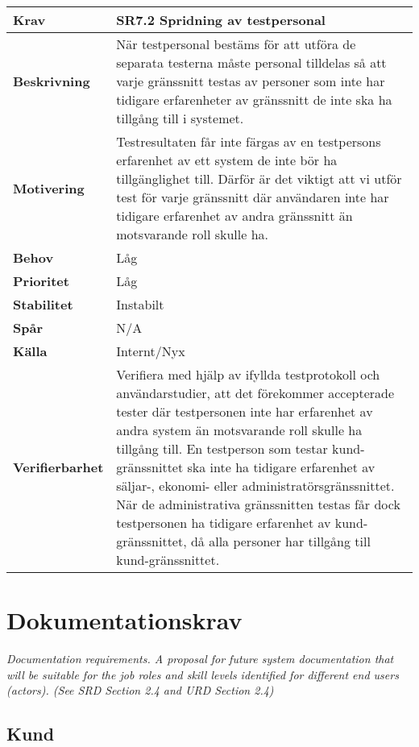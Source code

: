 \documentclass[a4paper, twoside, 11pt, titlepage]{article}
\begin{document}
	\begin{tabular} { p{2.6cm} p{12.5cm} }
		\hline
		\sffamily\textbf{Krav} & \sffamily\textbf{SR7.2 Spridning av testpersonal } \\
		\hline
		\sffamily\textbf{Beskrivning} & När testpersonal bestäms för att utföra de separata testerna måste personal tilldelas så att varje gränssnitt testas av personer som inte har tidigare erfarenheter av gränssnitt de inte ska ha tillgång till i systemet.  \\
		\hline
		\sffamily\textbf{Motivering} & Testresultaten får inte färgas av en testpersons erfarenhet av ett system de inte bör ha tillgänglighet till. Därför är det viktigt att vi utför test för varje gränssnitt där användaren inte har tidigare erfarenhet av andra gränssnitt än motsvarande roll skulle ha.  \\
		\hline
		\sffamily\textbf{Behov} & Låg  \\
		\hline
		\sffamily\textbf{Prioritet} & Låg  \\
		\hline
		\sffamily\textbf{Stabilitet} & Instabilt  \\
		\hline
		\sffamily\textbf{Spår} & N/A  \\
		\hline
		\sffamily\textbf{Källa} & Internt/Nyx  \\
		\hline
		\sffamily\textbf{Verifierbarhet} & Verifiera med hjälp av ifyllda testprotokoll och användarstudier, att det förekommer accepterade tester där testpersonen inte har erfarenhet av andra system än motsvarande roll skulle ha tillgång till.  En testperson som testar kund-gränssnittet ska inte ha tidigare erfarenhet av säljar-, ekonomi- eller administratörsgränssnittet. När de administrativa gränssnitten testas får dock  testpersonen ha tidigare erfarenhet av kund-gränssnittet, då alla personer har tillgång till kund-gränssnittet.  \\
		\hline
	\end{tabular}


\clearpage
\section{Dokumentationskrav}


\emph{Documentation requirements. A proposal for future system documentation that will be suitable for the job roles and skill levels identified for different end users (actors). (See SRD Section 2.4 and URD Section 2.4)}

	\subsection{Kund}
\end{document}
